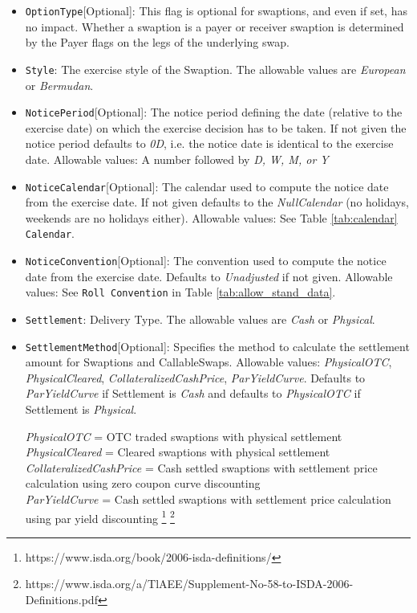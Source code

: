 \begin{itemize}
\item \lstinline!OptionType![Optional]: This flag is optional for swaptions, and even if set, has no impact. Whether a swaption is a payer or receiver swaption is determined by the Payer flags on the legs of the underlying swap.

\item  \lstinline!Style!: The exercise style of the Swaption. The allowable values are \emph{European} or \emph{Bermudan}.

\item \lstinline!NoticePeriod![Optional]: The notice period defining the date (relative to the exercise date) on which the exercise
  decision has to be taken. If not given the notice period defaults to \emph{0D}, i.e. the notice date is identical to the
  exercise date. Allowable values: A number followed by \emph{D, W, M, or Y}

\item \lstinline!NoticeCalendar![Optional]: The calendar used to compute the notice date from the exercise date. If not given
  defaults to the \emph{NullCalendar} (no holidays, weekends are no holidays either). Allowable values: See Table \ref{tab:calendar} \lstinline!Calendar!.

\item \lstinline!NoticeConvention![Optional]: The convention used to compute the notice date from the exercise date. Defaults to
  \emph{Unadjusted} if not given. Allowable values: See \lstinline!Roll Convention! in Table \ref{tab:allow_stand_data}.

\item  \lstinline!Settlement!: Delivery Type. The allowable values are \emph{Cash} or \emph{Physical}.

\item \lstinline!SettlementMethod![Optional]: Specifies the method to calculate the settlement amount for Swaptions and CallableSwaps. Allowable values: \emph{PhysicalOTC}, \emph{PhysicalCleared}, \emph{CollateralizedCashPrice}, \emph{ParYieldCurve}. Defaults to \emph{ParYieldCurve} if Settlement is \emph{Cash} and defaults to \emph{PhysicalOTC} if Settlement is \emph{Physical}.

\emph{PhysicalOTC} = OTC traded swaptions with physical settlement\\
\emph{PhysicalCleared} = Cleared swaptions with physical settlement\\
\emph{CollateralizedCashPrice} = Cash settled swaptions with settlement price calculation using zero coupon curve discounting \\
\emph{ParYieldCurve}  = Cash settled swaptions with settlement price calculation using par yield discounting \footnote{https://www.isda.org/book/2006-isda-definitions/} \footnote{https://www.isda.org/a/TlAEE/Supplement-No-58-to-ISDA-2006-Definitions.pdf} \\


\end{itemize}
